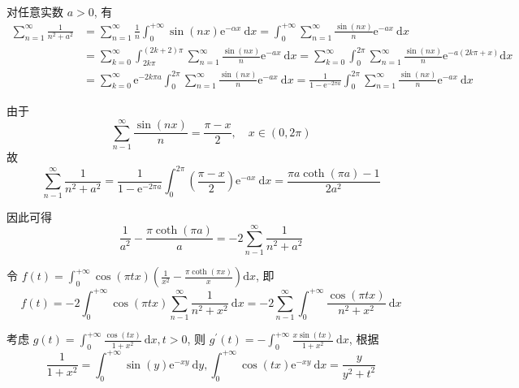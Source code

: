 \begin{solution}
\begin{enumerate}
              对任意实数 $a>0$, 有
              $$
                  \begin{aligned}
                      \sum_{n=1}^{\infty} \frac{1}{n^2+a^2} & =\sum_{n=1}^{\infty} \frac{1}{n} \int_0^{+\infty} \sin (n x) \mathrm{e}^{-\alpha x} \mathrm{~d} x=\int_0^{+\infty} \sum_{n=1}^{\infty} \frac{\sin (n x)}{n} \mathrm{e}^{-a x} \mathrm{~d} x                                                                    \\
                                                            & =\sum_{k=0}^{\infty} \int_{2 k \pi}^{(2 k+2) \pi} \sum_{n=1}^{\infty} \frac{\sin (n x)}{n} \mathrm{e}^{-a x} \mathrm{~d} x=\sum_{k=0}^{\infty} \int_0^{2 \pi} \sum_{n=1}^{\infty} \frac{\sin (n x)}{n} \mathrm{e}^{-a(2 k \pi+x)} \mathrm{d} x                 \\
                                                            & =\sum_{k=0}^{\infty} \mathrm{e}^{-2 k \pi a} \int_0^{2 \pi} \sum_{n=1}^{\infty} \frac{\sin (n x)}{n} \mathrm{e}^{-a x} \mathrm{~d} x=\frac{1}{1-\mathrm{e}^{-2 \pi a}} \int_0^{2 \pi} \sum_{n=1}^{\infty} \frac{\sin (n x)}{n} \mathrm{e}^{-a x} \mathrm{~d} x
                  \end{aligned}
              $$

              由于
              $$
                  \sum_{n-1}^{\infty} \frac{\sin (n x)}{n}=\frac{\pi-x}{2}, \quad x \in(0,2 \pi)
              $$
              故
              $$
                  \sum_{n-1}^{\infty} \frac{1}{n^2+a^2}=\frac{1}{1-\mathrm{e}^{-2 \pi a}} \int_0^{2 \pi}\left(\frac{\pi-x}{2}\right) \mathrm{e}^{-a x} \mathrm{~d} x=\frac{\pi a \operatorname{coth}(\pi a)-1}{2 a^2}
              $$

              因此可得
              $$
                  \frac{1}{a^2}-\frac{\pi \operatorname{coth}(\pi a)}{a}=-2 \sum_{n-1}^{\infty} \frac{1}{n^2+a^2}
              $$

              令 $f(t)=\int_0^{+\infty} \cos (\pi t x)\left(\frac{1}{x^2}-\frac{\pi \operatorname{coth}(\pi x)}{x}\right) \mathrm{d} x$, 即
              $$
                  f(t)=-2 \int_0^{+\infty} \cos (\pi t x) \sum_{n-1}^{\infty} \frac{1}{n^2+x^2} \mathrm{~d} x=-2 \sum_{n-1}^{\infty} \int_0^{+\infty} \frac{\cos (\pi t x)}{n^2+x^2} \mathrm{~d} x
              $$

              考虑 $g(t)=\int_0^{+\infty} \frac{\cos (t x)}{1+x^2} \mathrm{~d} x, t>0$, 则 $g^{\prime}(t)=-\int_0^{+\infty} \frac{x \sin (t x)}{1+x^2} \mathrm{~d} x$, 根据
              $$
                  \frac{1}{1+x^2}=\int_0^{+\infty} \sin (y) \mathrm{e}^{-x y} \mathrm{~d} y, \int_0^{+\infty} \cos (t x) \mathrm{e}^{-x y} \mathrm{~d} x=\frac{y}{y^2+t^2}
              $$


\end{enumerate}
\end{solution}
